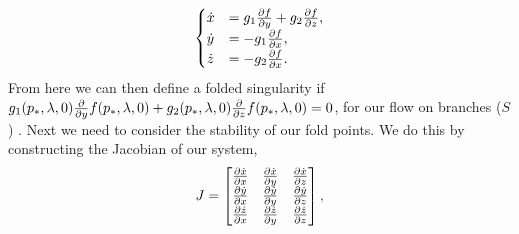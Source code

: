 \begin{equation} \label{somegenericthreedim}
\begin{cases}
\dot{x}&=g_1\pd{f}{y}+g_2\pd{f}{z},\\
\dot{y}&=-g_1\pd{f}{x},\\
\dot{z}&=-g_2\pd{f}{x}.
\end{cases}
\end{equation}
From here we can then define a folded singularity if $ g_1(p_*,\lambda,0)\pd{}{y}f(p_*,\lambda,0)+g_2(p_*,\lambda,0)\pd{}{z}f(p_*,\lambda,0)=0 $, for our flow on branches ($ S $) \citep{MMO}. Next we need to consider the stability of our fold points. We do this by constructing the Jacobian of our system, 
\begin{equation}
J=\begin{bmatrix}
\pd{\dot{x}}{x}&\pd{\dot{x}}{y}&\pd{\dot{x}}{z}\\
\pd{\dot{y}}{x}&\pd{\dot{y}}{y}&\pd{\dot{y}}{z}\\
\pd{\dot{z}}{x}&\pd{\dot{z}}{y}&\pd{\dot{z}}{z}\\
\end{bmatrix},
\end{equation}

